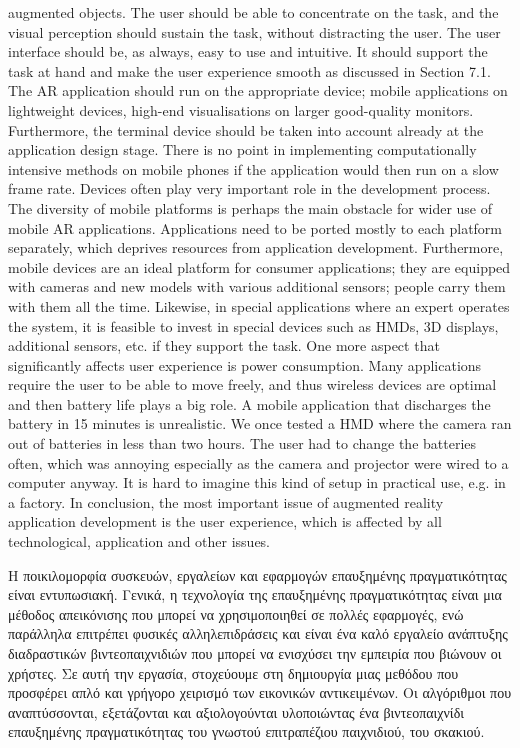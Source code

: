 augmented objects. The user should be able to concentrate on the task, and the visual perception should sustain the task, without distracting the user. The user interface should be, as always, easy to use and intuitive. It should support the task at hand and make the user experience smooth as discussed in Section 7.1. The AR application should run on the appropriate device; mobile applications on lightweight devices, high-end visualisations on larger good-quality monitors. Furthermore, the terminal device should be taken into account already at the application design stage. There is no point in implementing computationally intensive methods on mobile phones if the application would then run on a slow frame rate. Devices often play very important role in the development process. The diversity of mobile platforms is perhaps the main obstacle for wider use of mobile AR applications. Applications need to be ported mostly to each platform separately, which deprives resources from application development. Furthermore, mobile devices are an ideal platform for consumer applications; they are equipped with cameras and new models with various additional sensors; people carry them with them all the time. Likewise, in special applications where an expert operates the system, it is feasible to invest in special devices such as HMDs, 3D displays, additional sensors, etc. if they support the task. One more aspect that significantly affects user experience is power consumption. Many applications require the user to be able to move freely, and thus wireless devices are optimal and then battery life plays a big role. A mobile application that discharges the battery in 15 minutes is unrealistic. We once tested a HMD where the camera ran out of batteries in less than two hours. The user had to change the batteries often, which was annoying especially as the camera and projector were wired to a computer anyway. It is hard to imagine this kind of setup in practical use, e.g. in a factory. In conclusion, the most important issue of augmented reality application development is the user experience, which is affected by all technological, application and other issues.


Η ποικιλομορφία συσκευών, εργαλείων και εφαρμογών επαυξημένης πραγματικότητας είναι εντυπωσιακή. Γενικά, η τεχνολογία της επαυξημένης πραγματικότητας είναι μια μέθοδος απεικόνισης που μπορεί να χρησιμοποιηθεί σε πολλές εφαρμογές, ενώ παράλληλα επιτρέπει φυσικές αλληλεπιδράσεις και είναι ένα καλό εργαλείο ανάπτυξης διαδραστικών βιντεοπαιχνιδιών που μπορεί να ενισχύσει την εμπειρία που βιώνουν οι χρήστες. Σε αυτή την εργασία, στοχεύουμε στη δημιουργία μιας μεθόδου που προσφέρει απλό και γρήγορο χειρισμό των εικονικών αντικειμένων. Οι αλγόριθμοι που αναπτύσσονται, εξετάζονται και αξιολογούνται υλοποιώντας ένα βιντεοπαιχνίδι επαυξημένης πραγματικότητας του γνωστού επιτραπέζιου παιχνιδιού, του σκακιού.

